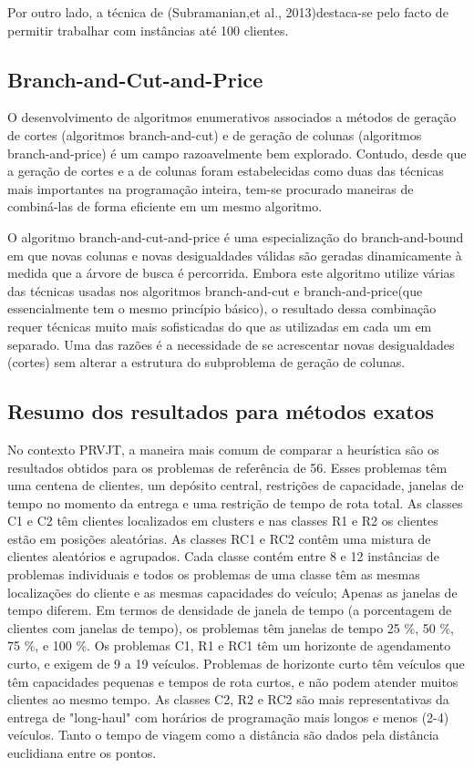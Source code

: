 Por outro lado, a técnica de (Subramanian,et al., 2013)destaca-se pelo facto de permitir trabalhar com instâncias até 100 clientes.

\subsection{Branch-and-Cut-and-Price}


O desenvolvimento de algoritmos enumerativos associados a métodos de geração de cortes (algoritmos branch-and-cut) e de geração de colunas (algoritmos branch-and-price) é um campo razoavelmente bem explorado. Contudo, desde que a geração de cortes e a de colunas foram estabelecidas como duas das técnicas mais importantes na programação inteira, tem-se procurado maneiras de combiná-las de forma eficiente em um mesmo algoritmo. 

O algoritmo branch-and-cut-and-price é uma especialização do branch-and-bound em que novas colunas e novas desigualdades válidas são geradas dinamicamente à medida que a árvore de busca é percorrida. Embora este algoritmo utilize várias das técnicas usadas nos algoritmos branch-and-cut e branch-and-price(que essencialmente tem o mesmo princípio básico), o resultado dessa combinação requer técnicas muito mais sofisticadas do que as utilizadas em cada um em separado. Uma das razões é a necessidade de se acrescentar novas desigualdades (cortes) sem alterar a estrutura do subproblema de geração de colunas.


\subsection{Resumo dos resultados para métodos exatos} 
 
No contexto PRVJT, a maneira mais comum de comparar a heurística são os resultados obtidos para os problemas de referência de \cite{solomon87} 56. Esses problemas têm uma centena de clientes, um depósito central, restrições de capacidade, janelas de tempo no momento da entrega e uma restrição de tempo de rota total. As classes C1 e C2 têm clientes localizados em clusters e nas classes R1 e R2 os clientes estão em posições aleatórias. As classes RC1 e RC2 contêm uma mistura de clientes aleatórios e agrupados. Cada classe contém entre 8 e 12 instâncias de problemas individuais e todos os problemas de uma classe têm as mesmas localizações do cliente e as mesmas capacidades do veículo; Apenas as janelas de tempo diferem. Em termos de densidade de janela de tempo (a porcentagem de clientes com janelas de tempo), os problemas têm janelas de tempo 25 \%, 50 \%, 75 \%, e 100 \%. Os problemas C1, R1 e RC1 têm um horizonte de agendamento curto, e exigem de 9 a 19 veículos. Problemas de horizonte curto têm veículos que têm capacidades pequenas e tempos de rota curtos, e não podem atender muitos clientes ao mesmo tempo. As classes C2, R2 e RC2 são mais representativas da entrega de "long-haul" com horários de programação mais longos e menos (2-4) veículos. Tanto o tempo de viagem como a distância são dados pela distância euclidiana entre os pontos.

